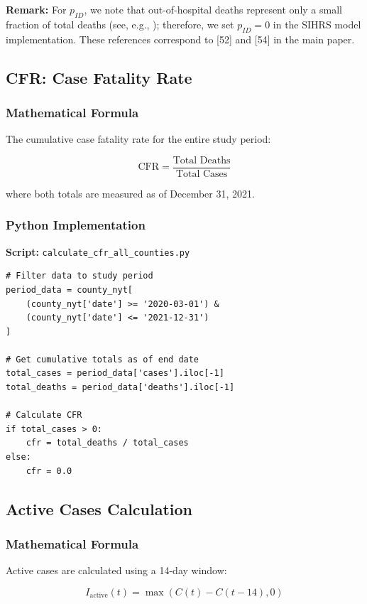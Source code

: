 \documentclass[11pt]{article}
\begin{document}
\textbf{Remark:} For $p_{ID}$, we note that out-of-hospital deaths represent only a small fraction of total deaths (see, e.g., \cite{O'Driscoll2021, Pathak2021}); therefore, we set $p_{ID} = 0$ in the SIHRS model implementation. These references correspond to [52] and [54] in the main paper.

\subsection{CFR: Case Fatality Rate}

\subsubsection{Mathematical Formula}
The cumulative case fatality rate for the entire study period:

\[
\text{CFR} = \frac{\text{Total Deaths}}{\text{Total Cases}}
\]

where both totals are measured as of December 31, 2021.

\subsubsection{Python Implementation}
\textbf{Script:} \texttt{calculate\_cfr\_all\_counties.py}

\begin{lstlisting}
# Filter data to study period
period_data = county_nyt[
    (county_nyt['date'] >= '2020-03-01') & 
    (county_nyt['date'] <= '2021-12-31')
]

# Get cumulative totals as of end date
total_cases = period_data['cases'].iloc[-1]
total_deaths = period_data['deaths'].iloc[-1]

# Calculate CFR
if total_cases > 0:
    cfr = total_deaths / total_cases
else:
    cfr = 0.0
\end{lstlisting}

\subsection{Active Cases Calculation}

\subsubsection{Mathematical Formula}
Active cases are calculated using a 14-day window:

\[
I_{\text{active}}(t) = \max(C(t) - C(t-14), 0)
\]
\end{document}
